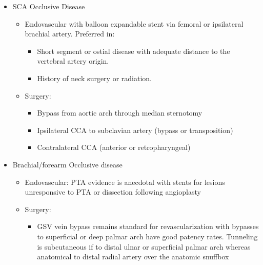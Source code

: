 \documentclass[
]{book}
\providecommand{\tightlist}{%
  \setlength{\itemsep}{0pt}\setlength{\parskip}{0pt}}
\begin{document}
\begin{itemize}
\item
  SCA Occlusive Disease

  \begin{itemize}
  \item
    Endovascular with balloon expandable stent via femoral or
    ipsilateral brachial artery.
    \citep{chatterjeeAngioplastyAloneAngioplasty2013, bradaricEndovascularTherapyStenoOcclusive2015, sahaSubclavianArteryDisease2017} Preferred in:

    \begin{itemize}
    \item
      Short segment or ostial disease with adequate distance to
      the vertebral artery origin.
    \item
      History of neck surgery or radiation.
    \end{itemize}
  \item
    Surgery:

    \begin{itemize}
    \item
      Bypass from aortic arch through median sternotomy~
    \item
      Ipsilateral CCA to subclavian artery (bypass or
      transposition)~
    \item
      Contralateral CCA (anterior or retropharyngeal)
    \end{itemize}
  \end{itemize}
\item
  Brachial/forearm Occlusive disease~

  \begin{itemize}
  \item
    Endovascular: PTA evidence is anecdotal with stents for lesions
    unresponsive to PTA or dissection following angioplasty~
  \item
    Surgery:~

    \begin{itemize}
    \tightlist
    \item
      GSV vein bypass remains standard for revascularization with
      bypasses to superficial or deep palmar arch have good
      patency rates. Tunneling is subcutaneous if to distal ulnar
      or superficial palmar arch whereas anatomical to distal
      radial artery over the anatomic snuffbox~
    \end{itemize}
  \end{itemize}
\end{itemize}
\end{document}
